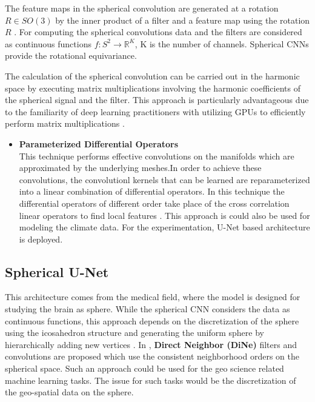 The feature maps in the spherical convolution are generated at a rotation $R \in SO(3)$ by the inner product of a filter and a feature map using the rotation $R$ \cite{cohen2018spherical}.
For computing the spherical convolutions data and the filters are considered as continuous functions $f: S^2 \rightarrow  \mathbb{R}^K $, K is the number of channels\cite{cohen2018spherical}.
Spherical CNNs provide the rotational equivariance.

The calculation of the spherical convolution can be carried out in the harmonic space by executing matrix multiplications involving the harmonic coefficients of the spherical signal and the filter. This approach is particularly advantageous due to the familiarity of deep learning practitioners with utilizing GPUs to efficiently perform matrix multiplications \cite{towardsdatascienceGeometricDeep}.

\begin{itemize}
    \item \textbf{Parameterized Differential Operators }\\
          This technique performs effective convolutions on the manifolds which are approximated by the underlying meshes.In order to achieve these convolutions, the convolutionl kernels that can be learned are reparameterized into a linear combination of differential operators. In this technique the differential operators of different order take place of the cross correlation linear operators to find local features \cite{jiang2019spherical}. This approach is could also be used for modeling the climate data.
          For the experimentation, U-Net based architecture is deployed.

\end{itemize}

\newpage

\subsection{Spherical U-Net}
This architecture comes from the medical field, where the model is designed for studying the brain as sphere. While the spherical CNN \cite{cohen2018spherical} considers the data as continuous functions, this approach depends on the discretization of the sphere using the icosahedron structure and generating the uniform sphere by hierarchically adding new vertices \cite{zhao2019spherical}.
In \cite{zhao2019spherical}, \textbf{Direct Neighbor (DiNe)} filters and convolutions are proposed which use the consistent neighborhood orders on the spherical space\cite{zhao2019spherical}. Such an approach could be used for the geo science related machine learning tasks. The issue for such tasks would be the discretization of the geo-spatial data on the sphere.


